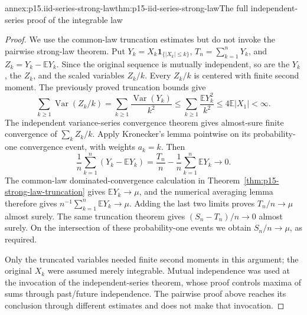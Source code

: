 \begin{annexitem}{annex:p15.iid-series-strong-law}{thm:p15-iid-series-strong-law}{The full independent-series proof of the integrable law}
\begin{proof}
We use the common-law truncation estimates but do not invoke the
pairwise strong-law theorem. Put
\(Y_k=X_k\mathbf1_{\{|X_k|\leq k\}}\),
\(T_n=\sum_{k=1}^nY_k\), and \(Z_k=Y_k-\mathbb EY_k\).
Since the original sequence is mutually independent, so are the
\(Y_k\), the \(Z_k\), and the scaled variables \(Z_k/k\).
Every \(Z_k/k\) is centered with finite second moment. The
previously proved truncation bounds give
\[
 \sum_{k\geq1}\operatorname{Var}(Z_k/k)
  =\sum_{k\geq1}\frac{\operatorname{Var}(Y_k)}{k^2}
  \leq\sum_{k\geq1}\frac{\mathbb EY_k^2}{k^2}
  \leq4\mathbb E|X_1|<\infty.
\]
The independent variance-series convergence theorem gives almost-sure
finite convergence of \(\sum_k Z_k/k\). Apply Kronecker's lemma
pointwise on its probability-one convergence event, with weights
\(a_k=k\). Then
\[
 \frac1n\sum_{k=1}^n(Y_k-\mathbb EY_k)
   =\frac{T_n}{n}-\frac1n\sum_{k=1}^n\mathbb EY_k
                                  \longrightarrow0.
\]
The common-law dominated-convergence calculation in
Theorem~\ref{thm:p15-strong-law-truncation} gives
\(\mathbb EY_k\to\mu\), and the numerical averaging lemma
therefore gives \(n^{-1}\sum_{k=1}^n\mathbb EY_k\to\mu\).
Adding the last two limits proves \(T_n/n\to\mu\) almost surely.
The same truncation theorem gives \((S_n-T_n)/n\to0\) almost
surely. On the intersection of these probability-one events we obtain
\(S_n/n\to\mu\), as required.

Only the truncated variables needed finite second moments in this
argument; the original \(X_k\) were assumed merely integrable.
Mutual independence was used at the invocation of the independent-series
theorem, whose proof controls maxima of sums through past/future
independence. The pairwise proof above reaches its conclusion through
different estimates and does not make that invocation.
\end{proof}
\end{annexitem}


